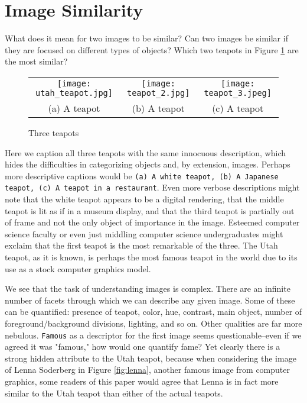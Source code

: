 
\section{Image Similarity}
What does it mean for two images to be similar? Can two images be similar if they are focused on different types of objects? Which two teapots in Figure \ref{fig:teapots} are the most similar?

\begin{figure}[!htbp]
	\centering
	\begin{tabular}{ccc}
		\texttt{[image: utah\_teapot.jpg]} &  
		\texttt{[image: teapot\_2.jpg]} & \texttt{[image: teapot\_3.jpeg]} \\
		(a) A teapot & (b) A teapot & (c) A teapot\\[6pt]
	\end{tabular}
	\label{fig:teapots}
	\caption{Three teapots}
\end{figure}

Here we caption all three teapots with the same innocuous description, which hides the difficulties in categorizing objects and, by extension, images. Perhaps more descriptive captions would be \texttt{(a) A white teapot, (b) A Japanese teapot, (c) A teapot in a restaurant}. Even more verbose descriptions might note that the white teapot appears to be a digital rendering, that the middle teapot is lit as if in a museum display, and that the third teapot is partially out of frame and not the only object of importance in the image. Esteemed computer science faculty or even just middling computer science undergraduates might exclaim that the first teapot is the most remarkable of the three. The Utah teapot, as it is known, is perhaps the most famous teapot in the world due to its use as a stock computer graphics model.

We see that the task of understanding images is complex. There are an infinite number of facets through which we can describe any given image. Some of these can be quantified: presence of teapot, color, hue, contrast, main object, number of foreground/background divisions, lighting, and so on. Other qualities are far more nebulous. \texttt{Famous} as a descriptor for the first image seems questionable--even if we agreed it was "famous," how would one quantify fame? Yet clearly there is a strong hidden attribute to the Utah teapot, because when considering the image of Lenna Soderberg in Figure \ref{fig:lenna}, another famous image from computer graphics, some readers of this paper would agree that Lenna is in fact more similar to the Utah teapot than either of the actual teapots.

